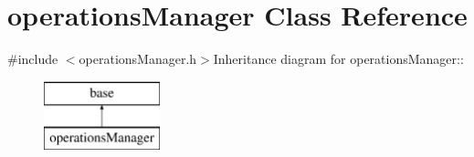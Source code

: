 \hypertarget{classoperations_manager}{
\section{operationsManager Class Reference}
\label{classoperations_manager}
}


{\ttfamily \#include $<$operationsManager.h$>$}Inheritance diagram for operationsManager::\begin{figure}[H]
\begin{center}
\leavevmode
\includegraphics[height=2cm]{classoperations_manager}
\end{center}
\end{figure}
